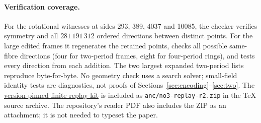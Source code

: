 \paragraph{Verification coverage.} For the rotational witnesses at sides 293, 389, 4037 and 10085, the checker verifies symmetry and all $281\,191\,312$ ordered directions between distinct points. For the large edited frames it regenerates the retained points, checks all possible same-fibre directions (four for two-period frames, eight for four-period rings), and tests every direction from each addition. The two largest expanded two-period lists reproduce byte-for-byte. No geometry check uses a search solver; small-field identity tests are diagnostics, not proofs of Sections~\ref{sec:encoding}--\ref{sec:two}. The \href{https://raw.githubusercontent.com/dimkadimon/No3InLine/e19b8a1b689eba392c7d26ec3733e88db566dc0e/paper/anc/no3-replay-r2.zip}{version-pinned finite replay kit} is included as \texttt{anc/no3-replay-r2.zip} in the TeX source archive. The repository's reader PDF also includes the ZIP as an attachment; it is not needed to typeset the paper.
